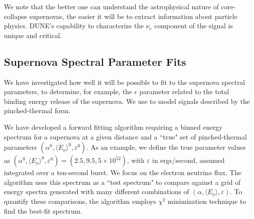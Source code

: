 We note that the better one can understand the astrophysical nature of core-collapse supernovae, the easier it will be to extract information about particle physics.  DUNE's capability to characterize the $\nu_e$ component of the signal is unique and critical.

\subsection{Supernova Spectral Parameter Fits}


We have investigated how well it will be possible to fit to the supernova
spectral parameters, to determine, for example, the $\epsilon$
parameter related to the total binding energy release of the supernova.  We 
use   to model signals described by the pinched-thermal form.

We have developed a
forward fitting algorithm requiring a   binned energy
spectrum for a supernova at a given distance and a ``true" set of
pinched-thermal parameters $(\alpha^0, \langle E_\nu \rangle^0,
\varepsilon^0)$. As an example, we define the true parameter values as
$(\alpha^0, \langle E_\nu \rangle^0, \varepsilon^0) = (2.5, 9.5,
5\times 10^{52})$, with $\varepsilon$ in ergs/second, assumed
integrated over a ten-second burst.
We focus on the electron neutrino flux. The algorithm uses this
spectrum as a ``test spectrum" to compare against a grid of energy
spectra generated with many different combinations of $(\alpha,
\langle E_\nu \rangle, \varepsilon)$. To quantify these comparisons,
the algorithm employs $\chi^2$ minimization technique to find the
best-fit spectrum.




